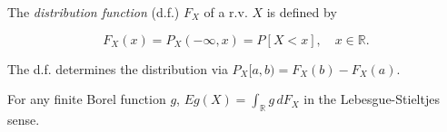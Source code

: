 The \textit{distribution function} (d.f.) $F_X$ of a r.v. $X$ is defined by

$$F_X(x) = P_X(-\infty, x) = P[X < x], \quad x \in \mathbb{R}.$$

The d.f. determines the distribution via $P_X[a, b) = F_X(b) - F_X(a)$.

For any finite Borel function $g$, $E g(X) = \int_{\mathbb{R}} g \, dF_X$ in the Lebesgue-Stieltjes sense.
